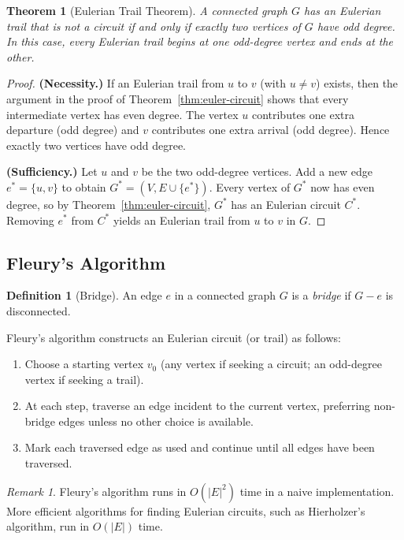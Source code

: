 \documentclass[12pt,a4paper]{article}
\theoremstyle{definition}
\newtheorem{definition}{Definition}[section]
\theoremstyle{plain}
\newtheorem{theorem}{Theorem}[section]
\theoremstyle{remark}
\newtheorem{remark}{Remark}[section]
\begin{document}
\begin{theorem}[Eulerian Trail Theorem]\label{thm:euler-trail}
A connected graph $G$ has an Eulerian trail that is not a circuit if and only if
exactly two vertices of $G$ have odd degree. In this case, every Eulerian trail begins
at one odd-degree vertex and ends at the other.
\end{theorem}

\begin{proof}
\textbf{(Necessity.)} If an Eulerian trail from $u$ to $v$ (with $u \neq v$) exists,
then the argument in the proof of Theorem~\ref{thm:euler-circuit} shows that every
intermediate vertex has even degree. The vertex $u$ contributes one extra departure
(odd degree) and $v$ contributes one extra arrival (odd degree). Hence exactly two
vertices have odd degree.

\textbf{(Sufficiency.)} Let $u$ and $v$ be the two odd-degree vertices. Add a new edge
$e^* = \{u,v\}$ to obtain $G^* = (V, E \cup \{e^*\})$. Every vertex of $G^*$ now has
even degree, so by Theorem~\ref{thm:euler-circuit}, $G^*$ has an Eulerian circuit $C^*$.
Removing $e^*$ from $C^*$ yields an Eulerian trail from $u$ to $v$ in $G$.
\end{proof}

\subsection{Fleury's Algorithm}

\begin{definition}[Bridge]\label{def:bridge}
An edge $e$ in a connected graph $G$ is a \emph{bridge} if $G - e$ is disconnected.
\end{definition}

Fleury's algorithm constructs an Eulerian circuit (or trail) as follows:

\begin{enumerate}
  \item Choose a starting vertex $v_0$ (any vertex if seeking a circuit; an odd-degree
        vertex if seeking a trail).
  \item At each step, traverse an edge incident to the current vertex, preferring
        non-bridge edges unless no other choice is available.
  \item Mark each traversed edge as used and continue until all edges have been traversed.
\end{enumerate}

\begin{remark}\label{rem:fleury-complexity}
Fleury's algorithm runs in $O(|E|^2)$ time in a naive implementation. More efficient
algorithms for finding Eulerian circuits, such as Hierholzer's algorithm, run in $O(|E|)$
time.
\end{remark}
\end{document}
